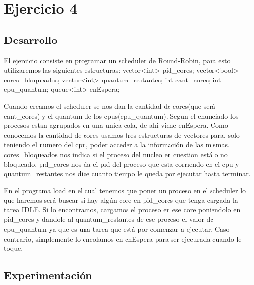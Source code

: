 \section{Ejercicio 4}

\subsection{Desarrollo}

El ejercicio consiste en programar un scheduler de Round-Robin, para esto utilizaremos las siguientes estructuras:
		vector<int> pid_cores;
		vector<bool> cores_bloqueados;
		vector<int> quantum_restantes;
		int cant_cores;
		int cpu_quantum;
		queue<int> enEspera;

Cuando creamos el scheduler se nos dan la cantidad de cores(que será cant_cores) y el quantum de los cpus(cpu_quantum). Segun el enunciado los procesos estan agrupados en 
una unica cola, de ahi viene enEspera. Como conocemos la cantidad de cores usamos tres estructuras de vectores para, solo teniendo el numero del cpu, poder acceder a la información
de las mismas. cores_bloqueados nos indica si el proceso del nucleo en cuestion está o no bloqueado, pid_cores nos da el pid del proceso que esta corriendo en el cpu y
quantum_restantes nos dice cuanto tiempo le queda por ejecutar hasta terminar.

En el programa load en el cual tenemos que poner un proceso en el scheduler lo que haremos será buscar si hay algún core en pid_cores que tenga cargada la tarea IDLE. 
Si lo encontramos, cargamos el proceso en ese core poniendolo en pid_cores y dandole al quantum_restantes de ese proceso el valor de cpu_quantum ya que es una tarea que está
por comenzar a ejecutar. Caso contrario, simplemente lo encolamos en enEspera para ser ejecurada cuando le toque.




\subsection{Experimentación}
